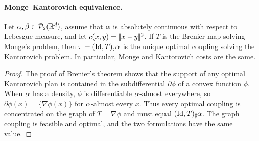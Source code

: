 \paragraph{Monge--Kantorovich equivalence.}
\begin{cor}\label{cor-monge-kantorovich-brenier}
Let $\alpha,\beta\in\mathcal{P}_2(\mathbb{R}^d)$, assume that $\alpha$ is absolutely continuous with respect to Lebesgue measure, and let $c(x,y)=|\!| x-y |\!|^2$. If $T$ is the Brenier map solving Monge's problem, then $\pi=(\mathrm{Id},T)_\sharp\alpha$ is the unique optimal coupling solving the Kantorovich problem. In particular, Monge and Kantorovich costs are the same.
\end{cor}
\begin{proof}
The proof of Brenier's theorem shows that the support of any optimal Kantorovich plan is contained in the subdifferential $\partial\phi$ of a convex function $\phi$. When $\alpha$ has a density, $\phi$ is differentiable $\alpha$-almost everywhere, so $\partial\phi(x)=\{\nabla\phi(x)\}$ for $\alpha$-almost every $x$. Thus every optimal coupling is concentrated on the graph of $T=\nabla\phi$ and must equal $(\mathrm{Id},T)_\sharp\alpha$. The graph coupling is feasible and optimal, and the two formulations have the same value.
\end{proof}
